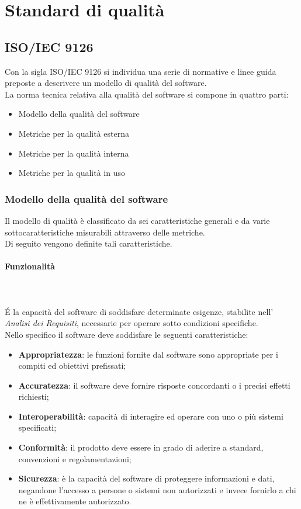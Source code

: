 \section{Standard di qualità}

\subsection{ISO/IEC 9126}
Con la sigla ISO/IEC 9126 si individua una serie di normative e linee guida preposte a descrivere un modello di qualità del software. \\
La norma tecnica relativa alla qualità del software si compone in quattro parti:
\begin{itemize}
	\item Modello della qualità del software
	\item Metriche per la qualità esterna
	\item Metriche per la qualità interna
	\item Metriche per la qualità in uso
\end{itemize}
\subsubsection{Modello della qualità del software}
Il modello di qualità è classificato da sei caratteristiche generali e da varie sottocaratteristiche misurabili attraverso delle metriche.\\
Di seguito vengono definite tali caratteristiche.

\paragraph{Funzionalità} \mbox{} \\ \mbox{} \\
\'E la capacità del software di soddisfare determinate esigenze, stabilite nell' \textit{Analisi dei Requisiti}, necessarie per operare sotto condizioni specifiche. \\
Nello specifico il software deve soddisfare le seguenti caratteristiche:
\begin{itemize}
	\item \textbf{Appropriatezza}: le funzioni fornite dal software sono appropriate per i compiti ed obiettivi prefissati;
	\item \textbf{Accuratezza}: il software deve fornire risposte concordanti o i precisi effetti richiesti;
	\item \textbf{Interoperabilità}: capacità di interagire ed operare con uno o più sistemi specificati;
	\item \textbf{Conformità}: il prodotto deve essere in grado di aderire a standard, convenzioni e regolamentazioni;
	\item \textbf{Sicurezza}: è la capacità del software di proteggere informazioni e dati, negandone l'accesso a persone o sistemi non autorizzati e invece fornirlo a chi ne è effettivamente autorizzato.
\end{itemize}
